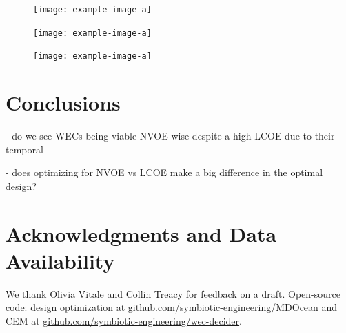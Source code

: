 \documentclass[10pt,twoside]{article}
\begin{document}
\begin{figure}[t]
\noindent
\begin{minipage}[t]{0.32\textwidth}
    \centering
    \texttt{[image: example-image-a]}
    \label{fig:single-obj-compare}
\end{minipage}
\hfill
\begin{minipage}[t]{0.32\textwidth}
    \centering
    \texttt{[image: example-image-a]}
    \label{fig:pareto}
\end{minipage}
\hfill
\begin{minipage}[t]{0.32\textwidth}
    \centering
    \texttt{[image: example-image-a]}
    \label{fig:design-heuristics}
\end{minipage}
\end{figure}

\lipsum[1]

\section{Conclusions}
\lipsum[1]

- do we see WECs being viable NVOE-wise despite a high LCOE due to their temporal

- does optimizing for NVOE vs LCOE make a big difference in the optimal design?

\section*{Acknowledgments and Data Availability}
We thank Olivia Vitale and Collin Treacy for feedback on a draft. Open-source code: design optimization at \url{github.com/symbiotic-engineering/MDOcean} and CEM at \url{github.com/symbiotic-engineering/wec-decider}.

\clearpage

\end{document}
